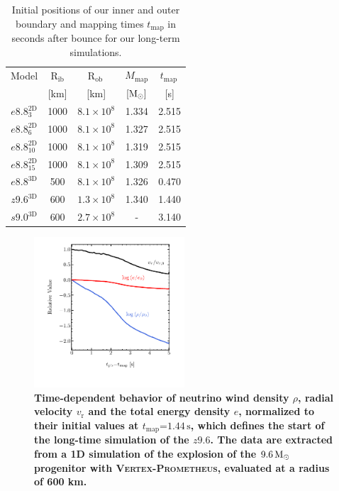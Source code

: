 \documentclass[fleqn,usenatbib]{mnras}
\newcommand{\solm}{\ensuremath{\rm{M_{\odot}}}\xspace}
\newcommand{\s}{\ensuremath{\text{s}}}
\newcommand{\vertexprom}{\textsc{Vertex-Prometheus}\xspace}
\begin{document}
\begin{table} %
 \centering
 \caption{Initial positions of our inner and outer boundary and mapping times $t_\mathrm{map}$ in seconds after bounce for our long-term simulations. }
\label{tab:long term boundaries}
\begin{tabular}{ccccc}
  \hline
 Model & $\mathrm{R_{ib}}$ & $\mathrm{R_{ob}\,}$ & $M_{\mathrm{map}}$ &  $t_{\mathrm{map}}\,$   \\
       & [km] & [km] & $[\solm]$ & [s]  \\
  \hline
 $e8.8^{\mathrm{2D}}_{3}$  & 1000 & $8.1\times10^{8}$ & 1.334 & 2.515 \\
 $e8.8^{\mathrm{2D}}_{6}$  & 1000 & $8.1\times10^{8}$ & 1.327 & 2.515 \\
 $e8.8^{\mathrm{2D}}_{10}$ & 1000 & $8.1\times10^{8}$ & 1.319 & 2.515 \\
 $e8.8^{\mathrm{2D}}_{15}$ & 1000 & $8.1\times10^{8}$ & 1.309 & 2.515 \\
 $e8.8^{\mathrm{3D}}$      & 500  & $8.1\times10^{8}$ & 1.326 & 0.470 \\
 $z9.6^{\mathrm{3D}}$      & 600  & $1.3\times10^{8}$ & 1.340 & 1.440 \\
 $s9.0^{\mathrm{3D}}$      & 600  & $2.7\times10^{8}$ & -     & 3.140 \\
  \hline
\end{tabular}
\end{table} %
\begin{figure} %
\label{fig:wind}
 \centering
 \includegraphics[width=0.50\textwidth,trim=0.2cm 1.2cm 0.2cm 0.2cm,clip]{./pic/wind_paper.pdf}
 \caption{\textbf{Time-dependent behavior of neutrino wind density $\rho$, radial velocity $v_{\mathrm{r}}$ and the total energy density $e$, normalized to their initial values at $t_{\mathrm{map}}\mathord{=}1.44\,\s$, which defines the start of the long-time simulation of the $z9.6$. The data are extracted from a 1D simulation of the explosion of the $9.6\,\solm$ progenitor with \vertexprom \citep{Mirizzi2016}, evaluated at a radius of 600 km.} }
\end{figure}%
\end{document}
